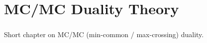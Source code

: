 \chapter{MC/MC Duality Theory}
\label{chap:03}
\paragraph{}Short chapter on MC/MC (min-common / max-crossing) duality.



% 
% 

